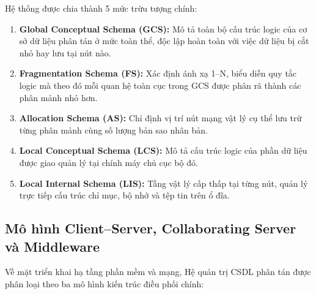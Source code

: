 \documentclass[12pt,a4paper]{report}
\begin{document}
Hệ thống được chia thành 5 mức trừu tượng chính:
\begin{enumerate}[leftmargin=0.8cm, topsep=2pt, itemsep=2pt]
    \item \textbf{Global Conceptual Schema (GCS):} Mô tả toàn bộ cấu trúc logic của cơ sở dữ liệu phân tán ở mức toàn thể, độc lập hoàn toàn với việc dữ liệu bị cắt nhỏ hay lưu tại nút nào.
    \item \textbf{Fragmentation Schema (FS):} Xác định ánh xạ 1--N, biểu diễn quy tắc logic mà theo đó mỗi quan hệ toàn cục trong GCS được phân rã thành các phân mảnh nhỏ hơn.
    \item \textbf{Allocation Schema (AS):} Chỉ định vị trí nút mạng vật lý cụ thể lưu trữ từng phân mảnh cùng số lượng bản sao nhân bản.
    \item \textbf{Local Conceptual Schema (LCS):} Mô tả cấu trúc logic của phần dữ liệu được giao quản lý tại chính máy chủ cục bộ đó.
    \item \textbf{Local Internal Schema (LIS):} Tầng vật lý cấp thấp tại từng nút, quản lý trực tiếp cấu trúc chỉ mục, bộ nhớ và tệp tin trên ổ đĩa.
\end{enumerate}

\subsection{Mô hình Client--Server, Collaborating Server và Middleware}
Về mặt triển khai hạ tầng phần mềm và mạng, Hệ quản trị CSDL phân tán được phân loại theo ba mô hình kiến trúc điều phối chính:
\end{document}
